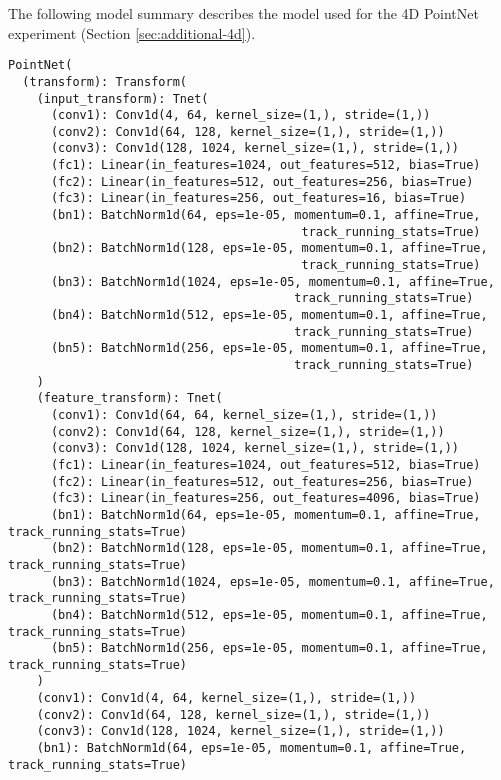 The following model summary describes the model used for the 4D PointNet experiment (Section \ref{sec:additional-4d}). 
\begin{verbatim}
PointNet(
  (transform): Transform(
    (input_transform): Tnet(
      (conv1): Conv1d(4, 64, kernel_size=(1,), stride=(1,))
      (conv2): Conv1d(64, 128, kernel_size=(1,), stride=(1,))
      (conv3): Conv1d(128, 1024, kernel_size=(1,), stride=(1,))
      (fc1): Linear(in_features=1024, out_features=512, bias=True)
      (fc2): Linear(in_features=512, out_features=256, bias=True)
      (fc3): Linear(in_features=256, out_features=16, bias=True)
      (bn1): BatchNorm1d(64, eps=1e-05, momentum=0.1, affine=True,
                                         track_running_stats=True)
      (bn2): BatchNorm1d(128, eps=1e-05, momentum=0.1, affine=True,
                                         track_running_stats=True)
      (bn3): BatchNorm1d(1024, eps=1e-05, momentum=0.1, affine=True,
                                        track_running_stats=True)
      (bn4): BatchNorm1d(512, eps=1e-05, momentum=0.1, affine=True,
                                        track_running_stats=True)
      (bn5): BatchNorm1d(256, eps=1e-05, momentum=0.1, affine=True,
                                        track_running_stats=True)
    )
    (feature_transform): Tnet(
      (conv1): Conv1d(64, 64, kernel_size=(1,), stride=(1,))
      (conv2): Conv1d(64, 128, kernel_size=(1,), stride=(1,))
      (conv3): Conv1d(128, 1024, kernel_size=(1,), stride=(1,))
      (fc1): Linear(in_features=1024, out_features=512, bias=True)
      (fc2): Linear(in_features=512, out_features=256, bias=True)
      (fc3): Linear(in_features=256, out_features=4096, bias=True)
      (bn1): BatchNorm1d(64, eps=1e-05, momentum=0.1, affine=True,                                              track_running_stats=True)
      (bn2): BatchNorm1d(128, eps=1e-05, momentum=0.1, affine=True,                                             track_running_stats=True)
      (bn3): BatchNorm1d(1024, eps=1e-05, momentum=0.1, affine=True,                                            track_running_stats=True)
      (bn4): BatchNorm1d(512, eps=1e-05, momentum=0.1, affine=True,                                             track_running_stats=True)
      (bn5): BatchNorm1d(256, eps=1e-05, momentum=0.1, affine=True,                                             track_running_stats=True)
    )
    (conv1): Conv1d(4, 64, kernel_size=(1,), stride=(1,))
    (conv2): Conv1d(64, 128, kernel_size=(1,), stride=(1,))
    (conv3): Conv1d(128, 1024, kernel_size=(1,), stride=(1,))
    (bn1): BatchNorm1d(64, eps=1e-05, momentum=0.1, affine=True,                                              track_running_stats=True)

\end{verbatim}
